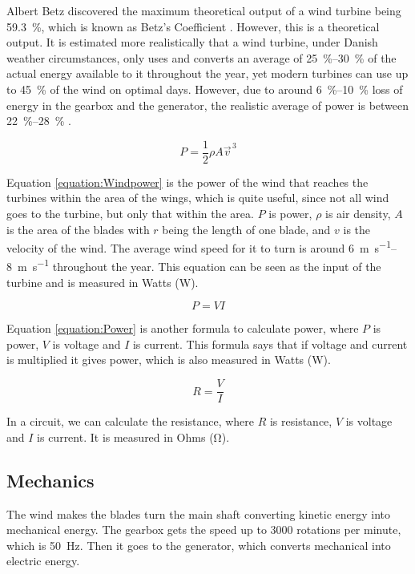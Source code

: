 \documentclass[12pt]{article}
\begin{document}
Albert Betz discovered the maximum theoretical output of a wind turbine being \SI{59,3}{\percent}, which is known as Betz's Coefficient \cite{Betz}.
However, this is a theoretical output.
It is estimated more realistically that a wind turbine, under Danish weather circumstances, only uses and converts an average of \SIrange{25}{30}{\percent} of the actual energy available to it throughout the year, yet modern turbines can use up to \SI{45}{\percent} of the wind on optimal days.
However, due to around \SIrange{6}{10}{\percent} loss of energy in the gearbox and the generator, the realistic average of power is between \SIrange{22}{28}{\percent} \cite{WindTurbineWorks}.

\begin{equation}
  P = \frac{1}{2} \rho A \vec{v}^{\,3}
  \label{equation:Windpower}
\end{equation}

Equation \ref{equation:Windpower} is the power of the wind that reaches the turbines within the area of the wings, which is quite useful, since not all wind goes to the turbine, but only that within the area.
$P$ is power, $\rho$ is air density, $A$ is the area of the blades with $r$ being the length of one blade, and $v$ is the velocity of the wind.
The average wind speed for it to turn is around \SIrange{6}{8}{\metre\per\second} throughout the year.
This equation can be seen as the input of the turbine and is measured in Watts (\si{\watt}).

\begin{equation}
  P=VI
  \label{equation:Power}
\end{equation}

Equation \ref{equation:Power} is another formula to calculate power, where $P$ is power, $V$ is voltage and $I$ is current.
This formula says that if voltage and current is multiplied it gives power, which is also measured in Watts (\si{\watt}).

\begin{equation}
  R = \frac{V}{I}
  \label{equation:Ohmslaw}
\end{equation}

In a circuit, we can calculate the resistance, where $R$ is resistance, $V$ is voltage and $I$ is current.
It is measured in Ohms (\si{\ohm}).

\subsection{Mechanics}
The wind makes the blades turn the main shaft converting kinetic energy into mechanical energy.
The gearbox gets the speed up to 3000 rotations per minute, which is \SI{50}{\hertz}.
Then it goes to the generator, which converts mechanical into electric energy.
\end{document}
